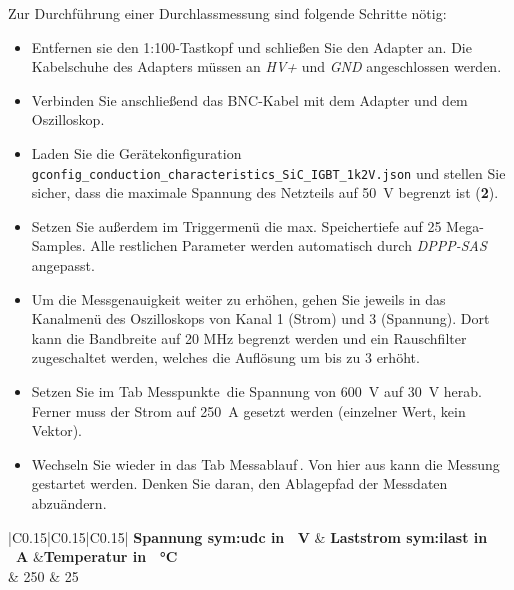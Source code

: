 Zur Durchführung einer Durchlassmessung sind folgende Schritte nötig:
\begin{itemize}
	\item Entfernen sie den 1:100-Tastkopf und schließen Sie den Adapter an. 
	Die Kabelschuhe des Adapters müssen an \textit{HV+} und \textit{GND} angeschlossen werden.
	\item Verbinden Sie anschließend das BNC-Kabel mit dem Adapter und dem Oszilloskop.	
	\item Laden Sie die Gerätekonfiguration \\
	\glqq\verb|gconfig_conduction_characteristics_SiC_IGBT_1k2V.json|\grqq{} und stellen Sie sicher, 
	dass die maximale Spannung des Netzteils auf \SI{50}{\volt} begrenzt ist (\textbf{2}). 
	\item Setzen Sie außerdem im Triggermenü die max. Speichertiefe auf 25 Mega-Samples. 
	Alle restlichen Parameter werden automatisch durch \textit{DPPP-SAS} angepasst.
	\item Um die Messgenauigkeit weiter zu erhöhen, gehen Sie jeweils in das Kanalmenü des Oszilloskops 
	von Kanal 1 (Strom) und 3 (Spannung). Dort kann die Bandbreite auf 20 MHz begrenzt werden und 
	ein Rauschfilter zugeschaltet werden, welches die Auflösung um bis zu \SI{3}{\bit} erhöht. 
	\item Setzen Sie im Tab \glqq Messpunkte\grqq \, die Spannung von \SI{600}{\volt} auf \SI{30}{\volt} herab. Ferner muss der Strom auf \SI{250}{\ampere} gesetzt werden (einzelner Wert, kein Vektor).
	\item Wechseln Sie wieder in das Tab \glqq Messablauf\grqq \,. Von hier aus kann die Messung gestartet werden. 
	Denken Sie daran, den Ablagepfad der Messdaten abzuändern.\\

\end{itemize}

\begin{table}[htb]
	\centering
	\caption{Arbeitspunkt für die Durchlassmessung}
	\label{tab:AP1200d}
	\begin{tabular}{|C{0.15\textwidth}|C{0.15\textwidth}|C{0.15\textwidth}|}
		\hline
		\textbf{Spannung \gls{sym:udc} in \SI{}{\volt}} & \textbf{Laststrom \gls{sym:ilast} in \SI{}{\ampere}} &\textbf{Temperatur in \SI{}{\degreeCelsius}} \\
		 & 250 & 25  \\
		\hline
	\end{tabular}
\end{table}

